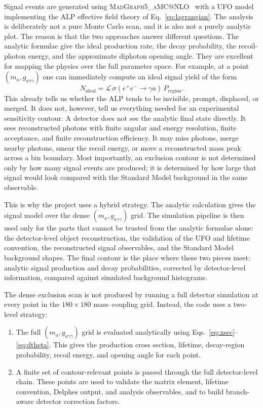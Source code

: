 \documentclass[12pt,a4paper]{article}
\newcommand{\gagg}{g_{a\gamma\gamma}}
\newcommand{\Lint}{\mathcal{L}}
\begin{document}
Signal events are generated using \textsc{MadGraph5\_aMC@NLO}~\cite{MG5} with a
UFO model implementing the ALP effective field theory of Eq.~\eqref{eq:lagrangian}.
The analysis is deliberately not a pure Monte Carlo scan, and it is also not a
purely analytic plot. The reason is that the two approaches answer different
questions.
The analytic formulae give the ideal production rate, the decay probability,
the recoil-photon energy, and the approximate diphoton opening angle. They are
excellent for mapping the physics over the full parameter space. For example,
at a point $(m_a,\gagg)$ one can immediately compute an ideal signal yield of
the form
\begin{equation}
    N_\mathrm{ideal}
    =
    \Lint\,\sigma(e^+e^-\to\gamma a)\,P_\mathrm{region}.
    \label{eq:nideal}
\end{equation}
This already tells us whether the ALP tends to be invisible, prompt, displaced,
or merged. It does not, however, tell us everything needed for an experimental
sensitivity contour. A detector does not see the analytic final state directly.
It sees reconstructed photons with finite angular and energy resolution, finite
acceptance, and finite reconstruction efficiency. It may miss photons, merge
nearby photons, smear the recoil energy, or move a reconstructed mass peak
across a bin boundary. Most importantly, an exclusion contour is not determined
only by how many signal events are produced; it is determined by how large that
signal would look compared with the Standard Model background in the same
observable.

This is why the project uses a hybrid strategy. The analytic calculation gives
the signal model over the dense $(m_a,\gagg)$ grid. The simulation pipeline is
then used only for the parts that cannot be trusted from the analytic formulae
alone: the detector-level object reconstruction, the validation of the UFO and
lifetime convention, the reconstructed signal observables, and the Standard
Model background shapes. The final contour is the place where these two pieces
meet: analytic signal production and decay probabilities, corrected by
detector-level information, compared against simulated background histograms.

The dense exclusion scan is not produced by running a full detector simulation
at every point in the $180\times180$ mass--coupling grid. Instead, the code uses
a two-level strategy:
\begin{enumerate}
    \item The full $(m_a,\gagg)$ grid is evaluated analytically using
    Eqs.~\eqref{eq:xsec}--\eqref{eq:dtheta}. This gives the production cross
    section, lifetime, decay-region probability, recoil energy, and opening
    angle for each point.
    \item A finite set of contour-relevant points is passed through the full
    detector-level chain. These points are used to validate the matrix element,
    lifetime convention, Delphes output, and analysis observables, and to build
    branch-aware detector correction factors.
\end{enumerate}
\end{document}
